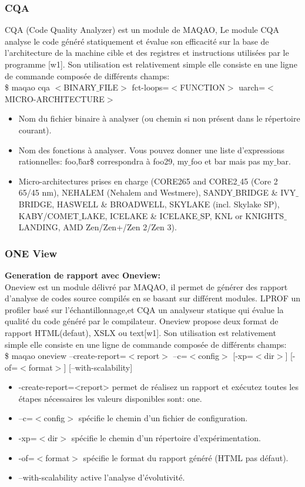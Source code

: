	\subsubsection{CQA}
	    CQA (Code Quality Analyzer) est un module de MAQAO, Le module CQA analyse le code généré statiquement et évalue son efficacité sur la base de l’architecture de la machine cible et des registres et instructions utilisées par le programme [w1]. Son utilisation est relativement simple elle consiste en une ligne de commande composée de différents champs:\\
\$ maqao cqa $<$BINARY$\_$FILE$>$ fct-loops=$<$FUNCTION$>$ uarch=$<$MICRO-ARCHITECTURE$>$ \\
\begin{itemize}
    \item Nom du fichier binaire à analyser (ou chemin si non présent dans le répertoire courant).
    \item Nom des fonctions à analyser. Vous pouvez donner une liste d'expressions rationnelles: 	foo,\^bar\$ correspondra à foo29, my$\_$foo et bar mais pas my$\_$bar.
    \item Micro-architectures prises en charge (CORE265 and CORE2$\_$45 (Core 2 65/45 nm), 	NEHALEM (Nehalem and Westmere), SANDY$\_$BRIDGE & IVY$\_$BRIDGE, HASWELL & 	BROADWELL, SKYLAKE (incl. Skylake SP), KABY/COMET$\_$LAKE, ICELAKE \& 	ICELAKE$\_$SP, KNL or KNIGHTS$\_$LANDING, AMD Zen/Zen+/Zen 2/Zen 3).
\end{itemize}
	\subsubsection{ONE View}
	\textbf{Generation de rapport avec Oneview:}\\
	
Oneview est un module délivré par MAQAO, il permet de générer des rapport d’analyse de codes source compilés en se basant sur différent modules. LPROF un profiler basé sur l'échantillonnage,et  CQA un analyseur statique qui évalue la qualité du code généré par le compilateur. Oneview propose deux format de rapport HTML(defaut), XSLX ou text[w1]. Son utilisation est relativement simple elle consiste en une ligne de commande composée de différents champs:\\
 \$ maqao oneview –create-report=$<$report$>$ –c=$<$config$>$ [-xp=$<$dir$>$] [-of=$<$format$>$] [--with-scalability]   
\begin{itemize}
    \item  -create-report=<report> permet de réalisez un rapport et exécutez toutes les étapes nécessaires les valeurs disponibles sont: one.
    \item   –c=$<$config$>$  spécifie le chemin d'un fichier de configuration.
    \item    -xp=$<$dir$>$ spécifie le chemin d'un répertoire d'expérimentation.
    \item -of=$<$format$>$ spécifie le format du rapport généré (HTML pas défaut).
    \item  --with-scalability active l’analyse d’évolutivité.
\end{itemize} 

     

